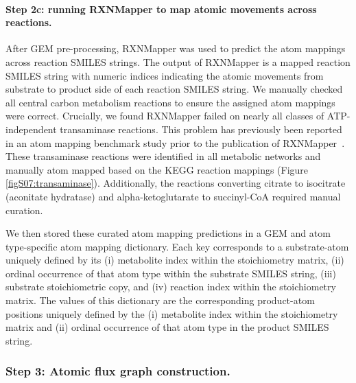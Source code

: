 \documentclass[12pt]{article}
\begin{document}
\paragraph{Step 2c: running RXNMapper to map atomic movements across reactions.}

After GEM pre-processing, RXNMapper was used to predict the atom mappings
across reaction SMILES strings. The output of RXNMapper is a mapped
reaction SMILES string with numeric indices indicating the atomic
movements from substrate to product side of each reaction SMILES string.
We manually checked all central carbon metabolism reactions to ensure the
assigned atom mappings were correct. Crucially, we found RXNMapper failed
on nearly all classes of ATP-independent transaminase reactions. This
problem has previously been reported in an atom mapping benchmark study
prior to the publication of
RXNMapper~\citep{PreciatGonzalezGermanA.2017Ceoa}. These transaminase
reactions were identified in all metabolic networks and manually atom
mapped based on the KEGG reaction mappings (Figure
\ref{figS07:transaminase}). Additionally, the reactions converting citrate
to isocitrate (aconitate hydratase) and alpha-ketoglutarate to
succinyl-CoA required manual curation.

We then stored these curated atom mapping predictions in a GEM and atom
type-specific atom mapping dictionary. Each key corresponds to
a substrate-atom uniquely defined by its (i) metabolite index within the
stoichiometry matrix, (ii) ordinal occurrence of that atom type within the
substrate SMILES string, (iii) substrate stoichiometric copy, and (iv)
reaction index within the stoichiometry matrix. The values of this
dictionary are the corresponding product-atom positions uniquely defined
by the (i) metabolite index within the stoichiometry matrix and (ii)
ordinal occurrence of that atom type in the product SMILES string.

\subsubsection*{Step 3: Atomic flux graph construction.}
\end{document}
